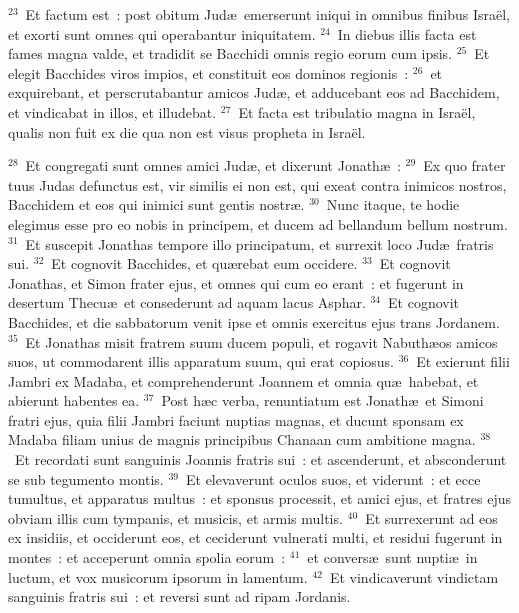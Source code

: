 ${}^{23}$~Et factum est~: post obitum Jud\ae\ emerserunt iniqui in omnibus finibus Isra\"el, et exorti sunt omnes qui operabantur iniquitatem.
${}^{24}$~In diebus illis facta est fames magna valde, et tradidit se Bacchidi omnis regio eorum cum ipsis.
${}^{25}$~Et elegit Bacchides viros impios, et constituit eos dominos regionis~:
${}^{26}$~et exquirebant, et perscrutabantur amicos Jud\ae , et adducebant eos ad Bacchidem, et vindicabat in illos, et illudebat.
${}^{27}$~Et facta est tribulatio magna in Isra\"el, qualis non fuit ex die qua non est visus propheta in Isra\"el.


${}^{28}$~Et congregati sunt omnes amici Jud\ae , et dixerunt Jonath\ae~:
${}^{29}$~Ex quo frater tuus Judas defunctus est, vir similis ei non est, qui exeat contra inimicos nostros, Bacchidem et eos qui inimici sunt gentis nostr\ae .
${}^{30}$~Nunc itaque, te hodie elegimus esse pro eo nobis in principem, et ducem ad bellandum bellum nostrum.
${}^{31}$~Et suscepit Jonathas tempore illo principatum, et surrexit loco Jud\ae\ fratris sui.
${}^{32}$~Et cognovit Bacchides, et qu\ae rebat eum occidere.
${}^{33}$~Et cognovit Jonathas, et Simon frater ejus, et omnes qui cum eo erant~: et fugerunt in desertum Thecu\ae\ et consederunt ad aquam lacus Asphar.
${}^{34}$~Et cognovit Bacchides, et die sabbatorum venit ipse et omnis exercitus ejus trans Jordanem.
${}^{35}$~Et Jonathas misit fratrem suum ducem populi, et rogavit Nabuth\ae os amicos suos, ut commodarent illis apparatum suum, qui erat copiosus.
${}^{36}$~Et exierunt filii Jambri ex Madaba, et comprehenderunt Joannem et omnia qu\ae\ habebat, et abierunt habentes ea.
${}^{37}$~Post h\ae c verba, renuntiatum est Jonath\ae\ et Simoni fratri ejus, quia filii Jambri faciunt nuptias magnas, et ducunt sponsam ex Madaba filiam unius de magnis principibus Chanaan cum ambitione magna.
${}^{38}$~Et recordati sunt sanguinis Joannis fratris sui~: et ascenderunt, et absconderunt se sub tegumento montis.
${}^{39}$~Et elevaverunt oculos suos, et viderunt~: et ecce tumultus, et apparatus multus~: et sponsus processit, et amici ejus, et fratres ejus obviam illis cum tympanis, et musicis, et armis multis.
${}^{40}$~Et surrexerunt ad eos ex insidiis, et occiderunt eos, et ceciderunt vulnerati multi, et residui fugerunt in montes~: et acceperunt omnia spolia eorum~:
${}^{41}$~et convers\ae\ sunt nupti\ae\ in luctum, et vox musicorum ipsorum in lamentum.
${}^{42}$~Et vindicaverunt vindictam sanguinis fratris sui~: et reversi sunt ad ripam Jordanis.


